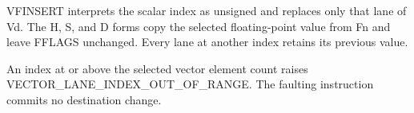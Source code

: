 VFINSERT interprets the scalar index as unsigned and replaces only that lane
of Vd. The H, S, and D forms copy the selected floating-point value from Fn
and leave FFLAGS unchanged. Every lane at another index retains its previous
value.

An index at or above the selected vector element count raises
VECTOR\_LANE\_INDEX\_OUT\_OF\_RANGE. The faulting instruction
commits no destination change.
